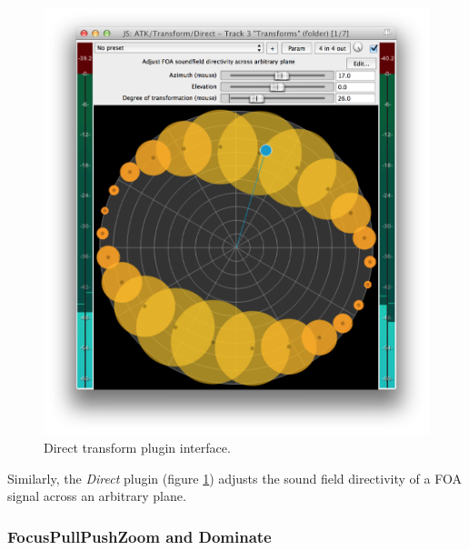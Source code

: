 \documentclass{article}
\begin{document}
\begin{figure}[h]
\captionsetup{aboveskip=-6pt}
\centering
\includegraphics[width=0.9\columnwidth]{figures/directTransform.png}
\caption{Direct transform plugin interface.\label{fig:directTransform}}
\end{figure}

Similarly, the \emph{Direct} plugin (figure \ref{fig:directTransform}) adjusts the sound field directivity of a FOA signal across an arbitrary plane.


 
\subsubsection{FocusPullPushZoom and Dominate}\label{sec:focus}
\end{document}
